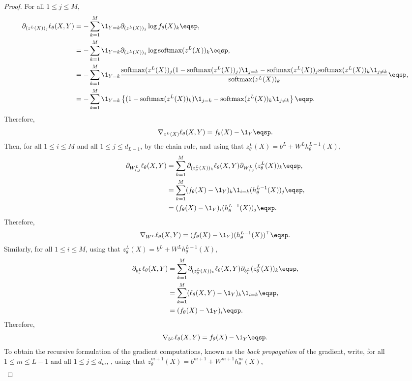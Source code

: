 \begin{proof}
For all $1\leqslant j\leqslant M$,
\begin{align*}
\partial_{(z^L(X))_j}\ell_{\theta}(X,Y) &=  -\sum_{k=1}^{M} \1_{Y=k}\partial_{(z^L(X))_j}\log f_{\theta}(X)_k\eqsp,\\
&=  -\sum_{k=1}^{M} \1_{Y=k}\partial_{(z^L(X))_j}\log \mathrm{softmax}(z^L(X))_k\eqsp,\\
&=  -\sum_{k=1}^{M} \1_{Y=k}\frac{\mathrm{softmax}(z^L(X))_j (1-\mathrm{softmax}(z^L(X))_j )\1_{j=k} - \mathrm{softmax}(z^L(X))_j \mathrm{softmax}(z^L(X))_k\1_{j\neq k}}{\mathrm{softmax}(z^L(X))_k}\eqsp,\\
&=  -\sum_{k=1}^{M} \1_{Y=k}\left\{(1-\mathrm{softmax}(z^L(X))_k )\1_{j=k} -  \mathrm{softmax}(z^L(X))_k\1_{j\neq k}\right\}\eqsp.
\end{align*}
Therefore,
$$
\nabla_{z^L(X)} \ell_{\theta}(X,Y) = f_{\theta}(X) - \1_Y\eqsp.
$$
Then, for all $1\leqslant i\leqslant M$ and all $1\leqslant j \leqslant d_{L-1}$, by the chain rule, and using that $z_{\theta}^L(X) = b^L + W^Lh_{\theta}^{L-1}(X)$,
\begin{align*}
\partial_{W^L_{i,j}}\ell_{\theta}(X,Y) &=  \sum_{k=1}^{M} \partial_{(z_{\theta}^L(X))_k}\ell_{\theta}(X,Y)\partial_{W^L_{i,j}}(z_{\theta}^L(X))_k\eqsp,\\
&=  \sum_{k=1}^{M} (f_{\theta}(X) - \1_Y)_k\1_{i=k}(h_{\theta}^{L-1}(X))_j\eqsp,\\
&=  (f_{\theta}(X) - \1_Y)_i(h_{\theta}^{L-1}(X))_j\eqsp.
\end{align*}
Therefore,
$$
\nabla_{W^L} \ell_{\theta}(X,Y) = (f_{\theta}(X) - \1_Y)(h_{\theta}^{L-1}(X))^\top\eqsp.
$$
Similarly, for all $1\leqslant i\leqslant M$,  using that $z_{\theta}^L(X) = b^L + W^Lh_{\theta}^{L-1}(X)$,
\begin{align*}
\partial_{b^L_{i}}\ell_{\theta}(X,Y) &=  \sum_{k=1}^{M} \partial_{(z_{\theta}^L(X))_k}\ell_{\theta}(X,Y)\partial_{b^L_{i}}(z_{\theta}^L(X))_k\eqsp,\\
&=  \sum_{k=1}^{M} (\ell_{\theta}(X,Y) - \1_Y)_k\1_{i=k}\eqsp,\\
&=  (f_{\theta}(X) - \1_Y)_i\eqsp.
\end{align*}
Therefore,
$$
\nabla_{b^L} \ell_{\theta}(X,Y) = f_{\theta}(X) - \1_Y\eqsp.
$$
To obtain the recursive formulation of the gradient computations, known as the {\em back propagation} of the gradient, write, for all $1\leqslant m \leqslant L-1$ and all $1\leqslant j \leqslant d_m$, ,  using that $z_{\theta}^{m+1}(X) = b^{m+1} + W^{m+1}h_{\theta}^{m}(X)$,
\begin{align*}

\end{align*}
\end{proof}
